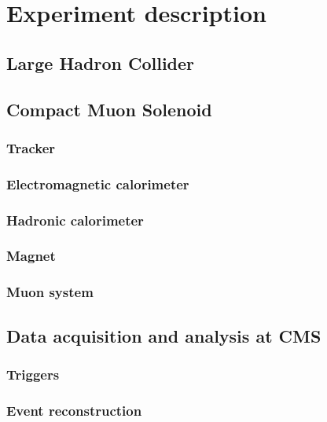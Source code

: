 \chapter{Experiment description\label{sec:experiment}}

\section{Large Hadron Collider\label{sec:lhc}}

\section{Compact Muon Solenoid\label{sec:cms}}

\subsection{Tracker\label{sec:cmstracker}}

\subsection{Electromagnetic calorimeter\label{sec:cmsecal}}

\subsection{Hadronic calorimeter\label{sec:cmshcal}}

\subsection{Magnet\label{sec:cmsmagnet}}

\subsection{Muon system\label{sec:cmsmuon}}

\section{Data acquisition and analysis at CMS\label{sec:cmsdaq}}

\subsection{Triggers\label{sec:cmstriggers}}

\subsection{Event reconstruction\label{sec:cmsreco}}